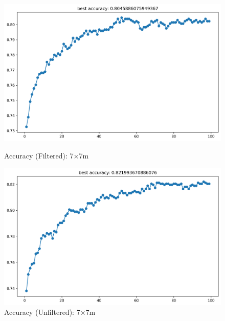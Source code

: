 \documentclass[runningheads]{llncs}
\begin{document}
\begin{figure}[H]
	\centering
	\begin{minipage}{0.49\textwidth}
		\centering
		\includegraphics[width=\textwidth]{figures/filtered/xgb_softmax_acc_7.png}
		\caption*{Accuracy (Filtered): 7×7m}
	\end{minipage}
	\hfill
	\begin{minipage}{0.49\textwidth}
		\centering
		\includegraphics[width=\textwidth]{figures/unfiltered/xgb_softmax_acc_7.png}
		\caption*{Accuracy (Unfiltered): 7×7m}
	\end{minipage}
\end{figure}
\end{document}
